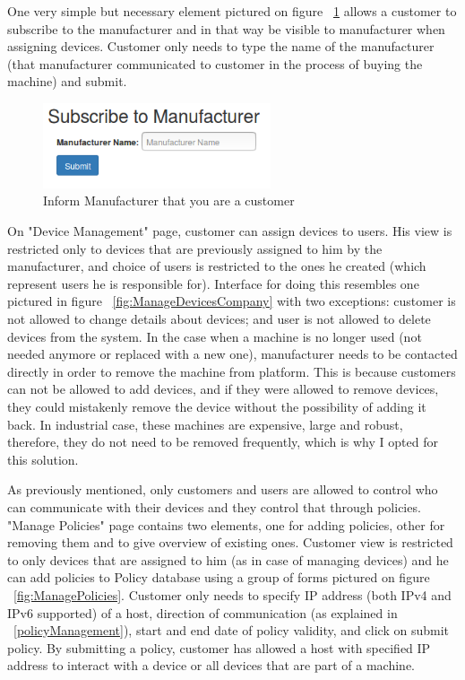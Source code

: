 One very simple but necessary element pictured on figure ~\ref{fig:SubscribeToManufacturer} allows a customer to subscribe to the manufacturer and in that way be visible to manufacturer when assigning devices. Customer only needs to type the name of the manufacturer (that manufacturer communicated to customer in the process of buying the machine) and submit.

\begin{figure}[ht]
	\begin{center}
		\includegraphics[width=0.6\textwidth]{images/implementation/SubscribeToManufacturer}
		\caption{Inform Manufacturer that you are a customer}
		\label{fig:SubscribeToManufacturer}
	\end{center}
\end{figure}

On "Device Management" page, customer can assign devices to users. His view is restricted only to devices that are previously assigned to him by the manufacturer, and choice of users is restricted to the ones he created (which represent users he is responsible for). Interface for doing this resembles one pictured in figure ~\ref{fig:ManageDevicesCompany} with two exceptions: customer is not allowed to change details about devices; and user is not allowed to 
delete devices from the system. In the case when a machine is no longer used (not needed anymore or replaced with a new one), manufacturer needs to be contacted directly in order to remove the machine from platform. This is because customers can not be allowed to add devices, and if they were allowed to remove devices, they could mistakenly remove the device without the possibility of adding it back. In industrial case, these machines are expensive, large and robust, therefore, they do not need to be removed frequently, which is why I opted for this solution.

As previously mentioned, only customers and users are allowed to control who can communicate with their devices and they control that through policies. "Manage Policies" page contains two elements, one for adding policies, other for removing them and to give overview of existing ones. Customer view is restricted to only devices that are assigned to him (as in case of managing devices) and he can add policies to Policy database using a group of forms pictured on figure ~\ref{fig:ManagePolicies}. Customer only needs to specify IP address (both IPv4 and IPv6 supported) of a host, direction of communication (as explained in ~\ref{policyManagement}), start and end date of policy validity, and click on submit policy. By submitting a policy, customer has allowed a host with specified IP address to interact with a device or all devices that are part of a machine.

